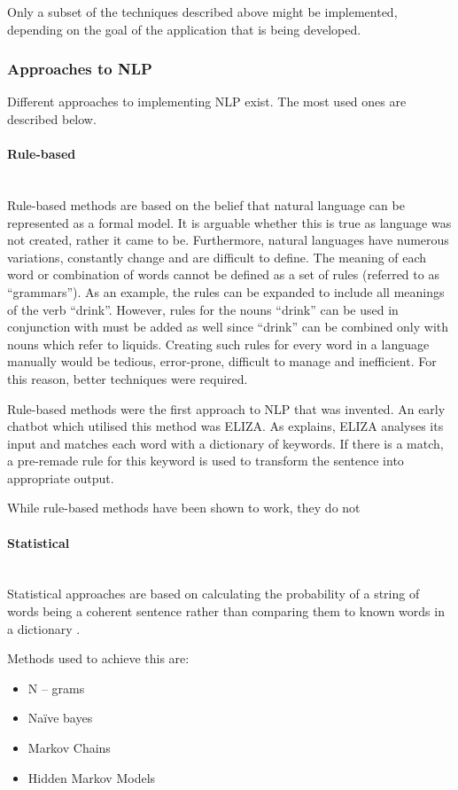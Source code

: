 \documentclass[12pt,a4paper]{article}
\newcommand{\myparagraph}[1]{\paragraph{#1}\mbox{}\\}
\begin{document}
Only a subset of the techniques described above might be implemented, depending on the goal of the application that is being developed.

\subsubsection{Approaches to NLP}
Different approaches to implementing NLP exist. The most used ones are described below.

\myparagraph{Rule-based}
Rule-based methods are based on the belief that natural language can be represented as a formal model. It is arguable whether this is true as language was not created, rather it came to be. Furthermore, natural languages have numerous variations, constantly change and are difficult to define. The meaning of each word or combination of words cannot be defined as a set of rules (referred to as \enquote{grammars}). As an example, the rules can be expanded to include all meanings of the verb \enquote{drink}. However, rules for the nouns \enquote{drink} can be used in conjunction with must be added as well since \enquote{drink} can be combined only with nouns which refer to liquids. Creating such rules for every word in a language manually would be tedious, error-prone, difficult to manage and inefficient. For this reason, better techniques were required.

Rule-based methods were the first approach to NLP that was invented. An early chatbot which utilised this method was ELIZA. As \citet{Weizenbaum:1966} explains, ELIZA analyses its input and matches each word with a dictionary of keywords. If there is a match, a pre-remade rule for this keyword is used to transform the sentence into appropriate output. 

While rule-based methods have been shown to work, they do not 
	
\myparagraph{Statistical}
Statistical approaches are based on calculating the probability of a string of words being a coherent sentence rather than comparing them to known words in a dictionary \citep{RusselStuart}. 
	
Methods used to achieve this are:
\begin{itemize}
	\item N – grams
	\item Naïve bayes
	\item Markov Chains
	\item Hidden Markov Models
\end{itemize}
\end{document}
